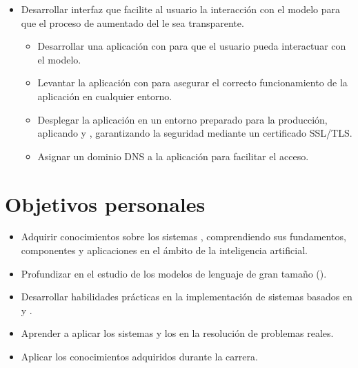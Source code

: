 \begin{itemize}
\begin{itemize}
	\end{itemize}
\item Desarrollar interfaz que facilite al usuario la interacción con el modelo para que el proceso de aumentado del  le sea transparente.
	\begin{itemize}
		\item Desarrollar una aplicación con  para que el usuario pueda interactuar con el modelo.
		\item Levantar la aplicación  con  para asegurar el correcto funcionamiento de la aplicación en cualquier entorno.
		\item Desplegar la aplicación  en un entorno preparado para la producción, aplicando  y , garantizando la seguridad mediante un certificado SSL/TLS.
		\item Asignar un dominio DNS a la aplicación para facilitar el acceso. 
	\end{itemize}
\end{itemize}

\section{Objetivos personales}

\begin{itemize}
\tightlist
\item Adquirir conocimientos sobre los sistemas , comprendiendo sus fundamentos, componentes y aplicaciones en el ámbito de la inteligencia artificial.
\item Profundizar en el estudio de los modelos de lenguaje de gran tamaño ().
\item Desarrollar habilidades prácticas en la implementación de sistemas basados en  y .
\item Aprender a aplicar los sistemas  y los  en la resolución de problemas reales.
\item Aplicar los conocimientos adquiridos durante la carrera.
\end{itemize}
